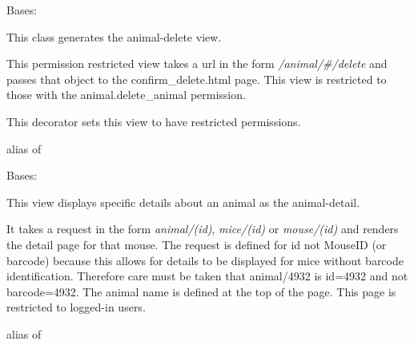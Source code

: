 \documentclass[letterpaper,10pt,english]{sphinxmanual}
\begin{document}
\begin{fulllineitems}
\label{api:mousedb.animal.views.AnimalDelete}
Bases: 

This class generates the animal-delete view.

This permission restricted view takes a url in the form \emph{/animal/\#/delete} and passes that object to the confirm\_delete.html page.
This view is restricted to those with the animal.delete\_animal permission.


\begin{fulllineitems}
\label{api:mousedb.animal.views.AnimalDelete.dispatch}
This decorator sets this view to have restricted permissions.

\end{fulllineitems}



\begin{fulllineitems}
\label{api:mousedb.animal.views.AnimalDelete.model}
alias of 

\end{fulllineitems}


\end{fulllineitems}



\begin{fulllineitems}
\label{api:mousedb.animal.views.AnimalDetail}
Bases: {\hyperref[api:mousedb.views.ProtectedDetailView]{}}

This view displays specific details about an animal as the animal-detail.

It takes a request in the form \emph{animal/(id)}, \emph{mice/(id)} or \emph{mouse/(id)} and renders the detail page for that mouse.  The request is defined for id not MouseID (or barcode) because this allows for details to be displayed for mice without barcode identification.
Therefore care must be taken that animal/4932 is id=4932 and not barcode=4932.  The animal name is defined at the top of the page.
This page is restricted to logged-in users.


\begin{fulllineitems}
\label{api:mousedb.animal.views.AnimalDetail.model}
alias of 

\end{fulllineitems}


\end{fulllineitems}
\end{document}
